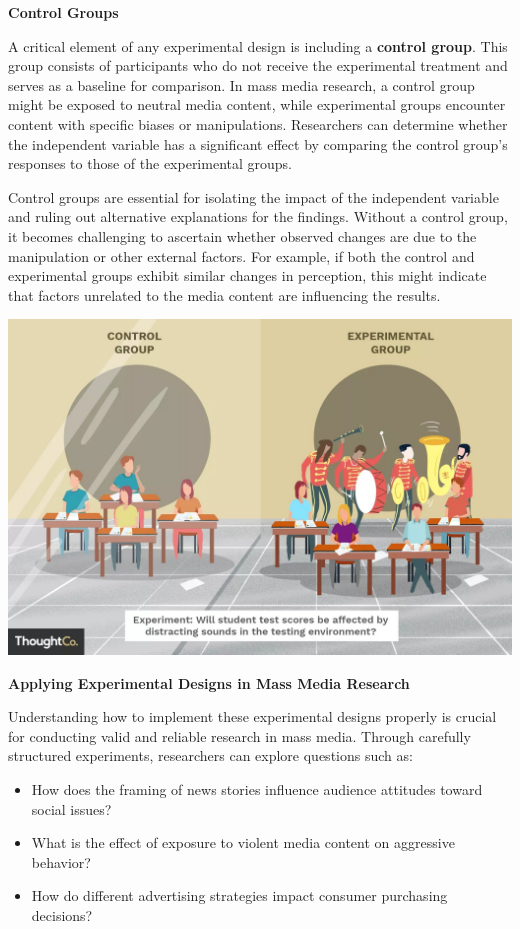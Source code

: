 \documentclass[
]{book}
\providecommand{\tightlist}{%
  \setlength{\itemsep}{0pt}\setlength{\parskip}{0pt}}
\begin{document}
\textbf{Control Groups}

A critical element of any experimental design is including a \textbf{control group}. This group consists of participants who do not receive the experimental treatment and serves as a baseline for comparison. In mass media research, a control group might be exposed to neutral media content, while experimental groups encounter content with specific biases or manipulations. Researchers can determine whether the independent variable has a significant effect by comparing the control group's responses to those of the experimental groups.

Control groups are essential for isolating the impact of the independent variable and ruling out alternative explanations for the findings. Without a control group, it becomes challenging to ascertain whether observed changes are due to the manipulation or other external factors. For example, if both the control and experimental groups exhibit similar changes in perception, this might indicate that factors unrelated to the media content are influencing the results.

\href{https://www.thoughtco.com/control-and-experimental-group-differences-606113}{\includegraphics[width=1\linewidth,height=\textheight,keepaspectratio]{images/control.jpg}}

\textbf{Applying Experimental Designs in Mass Media Research}

Understanding how to implement these experimental designs properly is crucial for conducting valid and reliable research in mass media. Through carefully structured experiments, researchers can explore questions such as:

\begin{itemize}
\tightlist
\item
  How does the framing of news stories influence audience attitudes toward social issues?
\item
  What is the effect of exposure to violent media content on aggressive behavior?
\item
  How do different advertising strategies impact consumer purchasing decisions?
\end{itemize}
\end{document}
